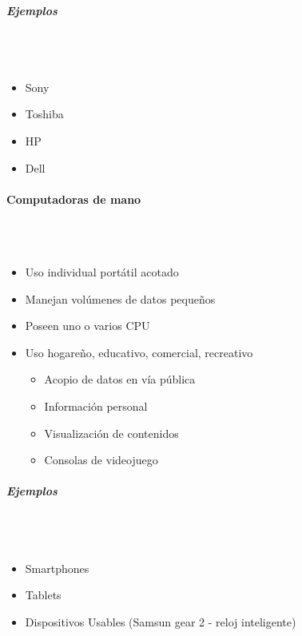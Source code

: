 \subparagraph{Ejemplos}\mbox{}\\\\
\begin{itemize}
\item Sony
\item Toshiba
\item HP
\item Dell
\end{itemize}

\paragraph{Computadoras de mano}\mbox{}\\\\%
\begin{itemize}
\item Uso individual portátil acotado
\item Manejan volúmenes de datos pequeños
\item Poseen uno o varios CPU
\item Uso hogareño, educativo, comercial, recreativo
	\begin{itemize}
	\item Acopio de datos en vía pública
	\item Información personal
	\item Visualización de contenidos
	\item Consolas de videojuego
	\end{itemize}
\end{itemize}

\subparagraph{Ejemplos}\mbox{}\\\\
\begin{itemize}
\item Smartphones
\item Tablets
\item Dispositivos Usables (Samsun gear 2 - reloj inteligente)
\end{itemize}

